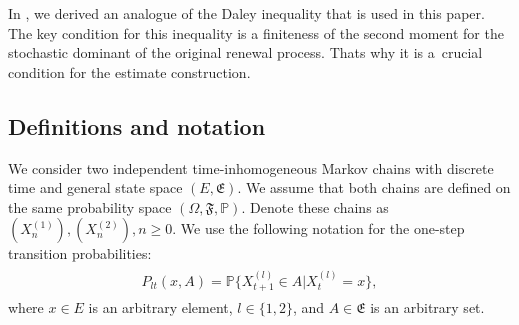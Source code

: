 \documentclass[numbers,compress,v1.0.1]{vmsta}
\theoremstyle{definition}
\begin{document}


In \cite{Excess}, we derived an analogue of the Daley inequality that
is used in this paper.
The key condition for this inequality is a finiteness of the second
moment for the stochastic dominant of the original renewal process.
Thats why it is a~crucial condition for the estimate construction.



\subsection{Definitions and notation}
We consider two independent time-inhomogeneous Markov chains with
discrete time and general state space $(E, \mathfrak{E})$. We assume
that both chains are defined on the same
probability space $(\varOmega, \mathfrak{F}, \mathbb{P})$.
Denote these chains as $(X^{(1)}_n), (X^{(2)}_n), n\ge0$.
We use the following notation for the one-step transition probabilities:
%
\begin{align}
%
\begin{array}{c}
P_{lt}(x, A) = \mathbb{P}\bigl\{X^{(l)}_{t+1} \in A \big| X^{(l)}_t = x\bigr\},
\end{array} %
\end{align}
%
where $x \in E$ is an arbitrary element, $l \in\{1,2\}$, and
$A\in\mathfrak{E}$ is an arbitrary set.
\end{document}
